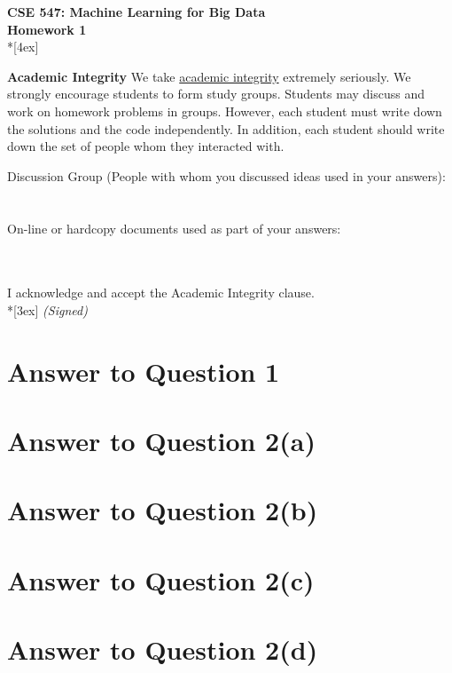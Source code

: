 \documentclass[11pt]{article}
\begin{document}
\thispagestyle{empty}
\parindent 0pt
\vfill
\large

\begin{center}
\LARGE{\bf \textsf{CSE 547: Machine Learning for Big Data}}\\ {\bf \textsf{Homework 1}} 
\\*[4ex]
\end{center}

\textbf{Academic Integrity} We take \href{https://www.cs.washington.edu/academics/misconduct}{academic integrity} extremely seriously. 
We strongly encourage students to form study groups. Students may discuss and work on homework problems in groups. However, each student must write down the solutions and the code independently. In addition, each student should write down the set of people whom they interacted with. 
\bigskip

Discussion Group (People with whom you discussed ideas used in your answers): \\\\\\
\vfill
On-line or hardcopy documents used as part of your answers: \\\\\\

\vfill

I acknowledge and accept the Academic Integrity clause.\\*[3ex]
\bigskip
\textit{(Signed)}\hrulefill
\pagebreak[4]

\section*{Answer to Question 1}

\pagebreak[4]
\section*{Answer to Question 2(a)}

\pagebreak[4]
\section*{Answer to Question 2(b)}

\pagebreak[4]
\section*{Answer to Question 2(c)}

\pagebreak[4]
\section*{Answer to Question 2(d)}
\end{document}
